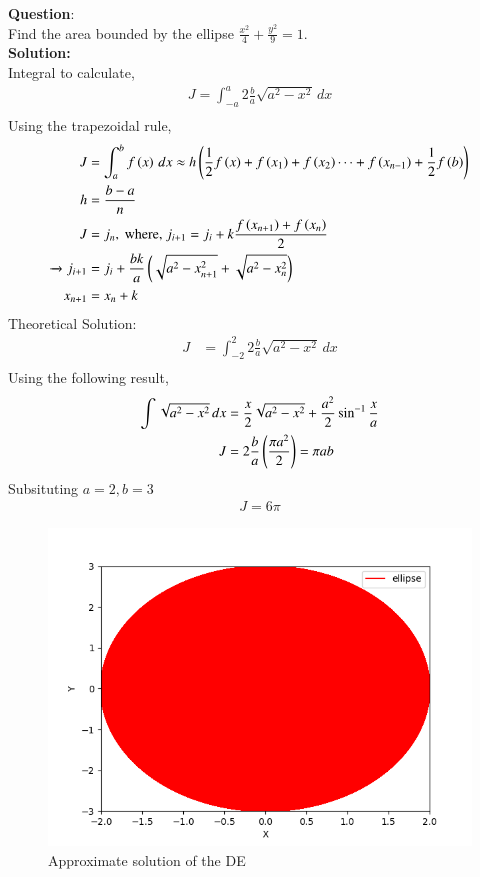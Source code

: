 \documentclass[journal]{IEEEtran}
\begin{document}
\textbf{Question}:\\
Find the area bounded by the ellipse $\frac{x^2}{4} + \frac{y^2}{9} = 1$.
\\
\textbf{Solution: }\\
Integral to calculate, 
\begin{align}
    J = \int_{-a}^{a}  2\frac{b}{a}\sqrt{a^2 - {x}^2} \, dx\\
\end{align}
Using the trapezoidal rule,
\begin{align}
    J &= \int_a^b f\left(x\right)\, dx \approx h\left(\frac{1}{2}f\left(x\right) + f\left(x_1\right) + f\left(x_2\right) \cdots + f\left(x_{n-1}\right) + \frac{1}{2}f\left(b\right)\right)\\
    h &= \frac{b-a}{n}\\
    J &= j_n, \text{ where, } j_{i + 1} = j_i + k\frac{f\left(x_{n+1}\right) + f\left(x_n\right)}{2}\\ 
    \xrightarrow{} j_{i + 1} &= j_i + \frac{bk}{a}\left(\sqrt{a^2 - x_{n+1}^2} + \sqrt{a^2 - x_n^2}\right)\\
    x_{n+1} &= x_n + k
\end{align}
Theoretical Solution:
\begin{align}
    J &= \int_{-2}^{2}  2\frac{b}{a}\sqrt{a^2 - {x}^2} \, dx\\
\end{align}
Using the following result, 
\begin{align}
    \int \sqrt{a^2 - x^2} \, dx &= \frac{x}{2} \sqrt{a^2 - x^2} + \frac{a^2}{2}\sin ^{-1} \frac{x}{a}\\ 
    J &= 2\frac{b}{a} \left(\frac{\pi a^2}{2}\right) = \pi ab
\end{align}
Subsituting $a = 2, b = 3$
\begin{align}
   J = 6\pi 
\end{align}
\begin{figure}[h!]
   \centering
   \includegraphics[width=0.7\columnwidth]{figs/fig.png}
    \caption{Approximate solution of the DE}
\end{figure}
\end{document}
